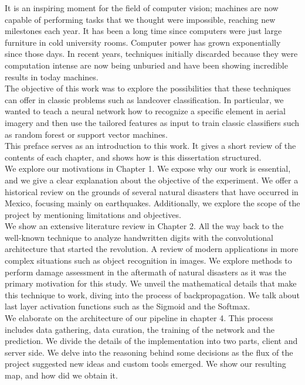 It is an inspiring moment for the field of computer vision; machines are now capable of performing tasks that we thought were impossible, reaching new milestones each year. It has been a long time since computers were just large furniture in cold university rooms. Computer power has grown exponentially since those days. In recent years, techniques initially discarded because they were computation intense are now being unburied and have been showing incredible results in today machines.\\

The objective of this work was to explore the possibilities that these techniques can offer in classic problems such as landcover classification. In particular, we wanted to teach a neural network how to recognize a specific element in aerial imagery and then use the tailored features as input to train classic classifiers such as random forest or support vector machines.\\

This preface serves as an introduction to this work. It gives a short review of the contents of each chapter, and shows how is this dissertation structured.\\

We explore our motivations in Chapter 1. We expose why our work is essential, and we give a clear explanation about the objective of the experiment. We offer a historical review on the grounds of several natural disasters that have occurred in Mexico, focusing mainly on earthquakes. Additionally, we explore the scope of the project by mentioning limitations and objectives.\\

We show an extensive literature review in Chapter 2. All the way back to the well-known technique to analyze handwritten digits with the convolutional architecture that started the revolution. A review of modern applications in more complex situations such as object recognition in images. We explore methods to perform damage assessment in the aftermath of natural disasters as it was the primary motivation for this study. We unveil the mathematical details that make this technique to work, diving into the process of backpropagation. We talk about last layer activation functions such as the Sigmoid and the Softmax.\\

We elaborate on the architecture of our pipeline in chapter 4. This process includes data gathering, data curation, the training of the network and the prediction. We divide the details of the implementation into two parts, client and server side. We delve into the reasoning behind some decisions as the flux of the project suggested new ideas and custom tools emerged. We show our resulting map, and how did we obtain it.\\

